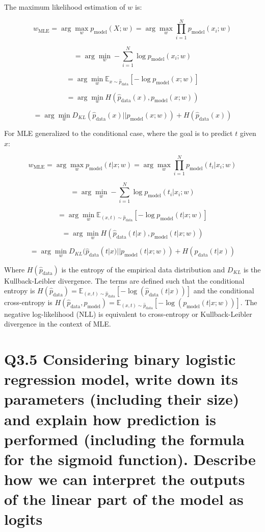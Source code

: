 \documentclass[11pt]{article}
\begin{document}
The maximum likelihood estimation of \( w \) is:

\[
w_{\text{MLE}} = \arg \max_w p_{\text{model}}(X; w) = \arg \max_w \prod_{i=1}^{N} p_{\text{model}}(x_i; w)
\]

\[
= \arg \min_w -\sum_{i=1}^{N} \log p_{\text{model}}(x_i; w)
\]

\[
= \arg \min_w \mathbb{E}_{x \sim \hat{p}_{\text{data}}}[- \log p_{\text{model}}(x; w)]
\]

\[
= \arg \min_w H(\hat{p}_{\text{data}}(x), p_{\text{model}}(x; w))
\]

\[
= \arg \min_w D_{KL}(\hat{p}_{\text{data}}(x) || p_{\text{model}}(x; w)) + H(\hat{p}_{\text{data}}(x))
\]

For MLE generalized to the conditional case, where the goal is to predict \( t \) given \( x \):

\[
w_{\text{MLE}} = \arg \max_w p_{\text{model}}(t | x; w) = \arg \max_w \prod_{i=1}^{N} p_{\text{model}}(t_i | x_i; w)
\]

\[
= \arg \min_w -\sum_{i=1}^{N} \log p_{\text{model}}(t_i | x_i; w)
\]

\[
= \arg \min_w \mathbb{E}_{(x,t) \sim \hat{p}_{\text{data}}}[- \log p_{\text{model}}(t | x; w)]
\]

\[
= \arg \min_w H(\hat{p}_{\text{data}}(t | x), p_{\text{model}}(t | x; w))
\]

\[
= \arg \min_w D_{KL}(\hat{p}_{\text{data}}(t | x) || p_{\text{model}}(t | x; w)) + H(\hat{p}_{\text{data}}(t | x))
\]

Where \( H(\hat{p}_{\text{data}}) \) is the entropy of the empirical data distribution and \( D_{KL} \) is the Kullback-Leibler divergence. The terms are defined such that the conditional entropy is \( H(\hat{p}_{\text{data}}) = \mathbb{E}_{(x,t) \sim \hat{p}_{\text{data}}}[-\log(\hat{p}_{\text{data}}(t | x))] \) and the conditional cross-entropy is \( H(\hat{p}_{\text{data}}, p_{\text{model}}) = \mathbb{E}_{(x,t) \sim \hat{p}_{\text{data}}}[-\log(p_{\text{model}}(t | x; w))] \). The negative log-likelihood (NLL) is equivalent to cross-entropy or Kullback-Leibler divergence in the context of MLE.


\section{Q3.5 Considering binary logistic regression model, write down its parameters (including their size) and explain how prediction is performed (including the formula for the sigmoid function). Describe how we can interpret the outputs of the linear part of the model as logits}
\end{document}
